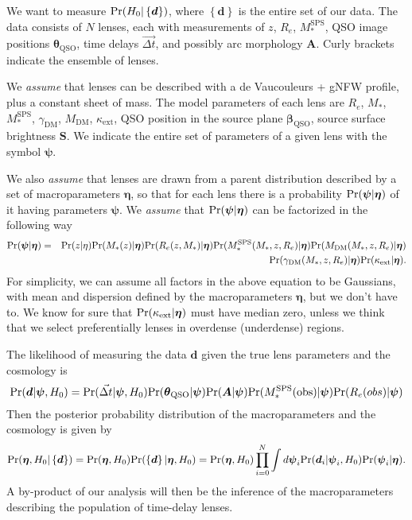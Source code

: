 \documentclass[letter]{article}
\def\pr{{\rm Pr}}
\def\reff{R_e}
\def\msps{M_*^{\mathrm{SPS}}}
\def\mdm{M_{\mathrm{DM}}}
\def\gammadm{\gamma_{\mathrm{DM}}}
\begin{document}
We want to measure $\pr(H_0|\left\{\boldsymbol{d}\right\})$, where $\left\{\boldsymbol{d}\right\}$ is the entire set of our data.
The data consists of $N$ lenses, each with measurements of $z$, $\reff$, $\msps$, QSO image positions $\boldsymbol{\theta}_{\mathrm{QSO}}$, time delays $\vec{\Delta t}$, and possibly arc morphology $\boldsymbol{A}$.
Curly brackets indicate the ensemble of lenses.

We {\em assume} that lenses can be described with a de Vaucouleurs + gNFW profile, plus a constant sheet of mass.
The model parameters of each lens are $\reff$, $M_*$, $\msps$, $\gammadm$, $\mdm$, $\kappa_{\mathrm{ext}}$, QSO position in the source plane $\boldsymbol{\beta}_{\mathrm{QSO}}$, source surface brightness $\boldsymbol{S}$. We indicate the entire set of parameters of a given lens with the symbol $\boldsymbol{\psi}$.

We also {\em assume} that lenses are drawn from a parent distribution described by a set of macroparameters $\boldsymbol{\eta}$, so that for each lens there is a probability $\pr(\boldsymbol{\psi}|\boldsymbol{\eta})$ of it having parameters $\boldsymbol{\psi}$. We {\em assume} that $\pr(\boldsymbol{\psi}|\boldsymbol{\eta})$ can be factorized in the following way
\begin{eqnarray}
\pr(\boldsymbol{\psi}|\boldsymbol{\eta}) = & & \pr(z|\eta)\pr(M_*(z)|\boldsymbol{\eta})\pr(\reff(z,M_*)|\boldsymbol{\eta})\pr(\msps(M_*,z,\reff)|\boldsymbol{\eta})\pr(\mdm(M_*,z,\reff)|\boldsymbol{\eta}) \nonumber \\
& & \pr(\gammadm(M_*,z,\reff)|\boldsymbol{\eta})\pr(\kappa_{\mathrm{ext}}|\boldsymbol{\eta}).
\end{eqnarray}
For simplicity, we can assume all factors in the above equation to be Gaussians, with mean and dispersion defined by the macroparameters $\boldsymbol{\eta}$, but we don't have to.
We know for sure that $\pr(\kappa_{\mathrm{ext}}|\boldsymbol{\eta})$ must have median zero, unless we think that we select preferentially lenses in overdense (underdense) regions.

The likelihood of measuring the data $\boldsymbol{d}$ given the true lens parameters and the cosmology is
\begin{equation}
\pr(\boldsymbol{d}|\boldsymbol{\psi},H_0) = \pr(\vec{\Delta t}|\boldsymbol{\psi},H_0)\pr(\boldsymbol{\theta}_{\mathrm{QSO}}|\boldsymbol{\psi})\pr(\boldsymbol{A}|\boldsymbol{\psi})\pr(\msps(\mathrm{obs})|\boldsymbol{\psi})\pr(\reff(obs)|\boldsymbol{\psi})
\end{equation}
Then the posterior probability distribution of the macroparameters and the cosmology is given by
\begin{equation}
\pr(\boldsymbol{\eta},H_0|\left\{\boldsymbol{d}\right\}) = \pr(\boldsymbol{\eta},H_0) \pr(\left\{\boldsymbol{d}\right\}|\boldsymbol{\eta},H_0) = \pr(\boldsymbol{\eta},H_0) \prod_{i=0}^N \int d\boldsymbol{\psi}_i \pr(\boldsymbol{d}_i|\boldsymbol{\psi}_i,H_0)\pr(\boldsymbol{\psi}_i|\boldsymbol{\eta}).
\end{equation}
A by-product of our analysis will then be the inference of the macroparameters describing the population of time-delay lenses.
\end{document}
